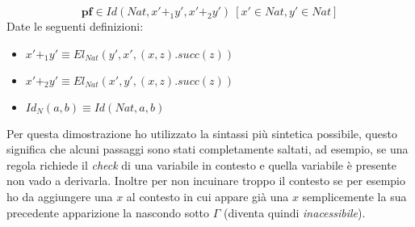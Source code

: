 \begin{displaymath}
    \textbf{pf} \in Id(Nat, x' +_1 y', x' +_2 y')\ [x' \in Nat, y' \in Nat]
\end{displaymath}
Date le seguenti definizioni:
\begin{itemize}
    \item $x' +_1 y' \equiv El_{Nat} (y', x', (x, z).succ(z))$
    \item $x' +_2 y' \equiv El_{Nat} (x', y', (x, z).succ(z))$
    \item $Id_N(a, b) \equiv Id(Nat, a, b)$
\end{itemize}
Per questa dimostrazione ho utilizzato la sintassi più sintetica possibile, questo significa che alcuni passaggi sono stati completamente saltati, ad esempio, se una regola richiede il \textit{check} di una variabile in contesto e quella variabile è presente non vado a derivarla.
Inoltre per non incuinare troppo il contesto se per esempio ho da aggiungere una $x$ al contesto in cui appare già una $x$ semplicemente la sua precedente apparizione la nascondo sotto $\Gamma$ (diventa quindi \textit{inacessibile}).
